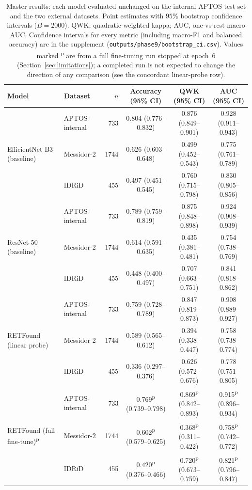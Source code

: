 \documentclass[journal]{IEEEtran}
\newcommand{\pv}[1]{#1\textsuperscript{p}}
\begin{document}
\begin{table}[!t]
\centering\footnotesize
\caption{Master results: each model evaluated unchanged on the internal APTOS test
set and the two external datasets. Point estimates with $95\%$ bootstrap
confidence intervals ($B=2000$). QWK, quadratic-weighted kappa; AUC, one-vs-rest
macro AUC. Confidence intervals for every metric (including macro-F1 and balanced
accuracy) are in the supplement (\texttt{outputs/phase9/bootstrap\_ci.csv}).
Values marked \textsuperscript{p} are from a full fine-tuning run stopped at
epoch~6 (Section~\ref{sec:limitations}); a completed run is not expected to change
the direction of any comparison (see the concordant linear-probe row).}
\label{tab:master}
\setlength{\tabcolsep}{5pt}
\begin{tabular}{llrccc}
\toprule
Model & Dataset & $n$ & Accuracy (95\% CI) & QWK (95\% CI) & AUC (95\% CI) \\
\midrule
\multirow{3}{*}{EfficientNet-B3 (baseline)}
 & APTOS-internal & 733  & 0.804 (0.776--0.832) & 0.876 (0.849--0.901) & 0.928 (0.911--0.943) \\
 & Messidor-2     & 1744 & 0.626 (0.603--0.648) & 0.499 (0.452--0.543) & 0.775 (0.761--0.789) \\
 & IDRiD          & 455  & 0.497 (0.451--0.545) & 0.760 (0.715--0.798) & 0.830 (0.805--0.856) \\
\midrule
\multirow{3}{*}{ResNet-50 (baseline)}
 & APTOS-internal & 733  & 0.789 (0.759--0.819) & 0.875 (0.848--0.898) & 0.924 (0.908--0.939) \\
 & Messidor-2     & 1744 & 0.614 (0.591--0.635) & 0.435 (0.381--0.481) & 0.754 (0.738--0.769) \\
 & IDRiD          & 455  & 0.448 (0.400--0.497) & 0.707 (0.663--0.751) & 0.841 (0.818--0.862) \\
\midrule
\multirow{3}{*}{RETFound (linear probe)}
 & APTOS-internal & 733  & 0.759 (0.728--0.789) & 0.847 (0.819--0.873) & 0.908 (0.889--0.927) \\
 & Messidor-2     & 1744 & 0.589 (0.565--0.612) & 0.394 (0.338--0.447) & 0.758 (0.738--0.774) \\
 & IDRiD          & 455  & 0.336 (0.297--0.376) & 0.626 (0.572--0.676) & 0.778 (0.751--0.805) \\
\midrule
\multirow{3}{*}{RETFound (full fine-tune)\textsuperscript{p}}
 & APTOS-internal & 733  & \pv{0.769} (0.739--0.798) & \pv{0.869} (0.842--0.893) & \pv{0.915} (0.896--0.934) \\
 & Messidor-2     & 1744 & \pv{0.602} (0.579--0.625) & \pv{0.368} (0.311--0.422) & \pv{0.758} (0.742--0.772) \\
 & IDRiD          & 455  & \pv{0.420} (0.376--0.466) & \pv{0.720} (0.673--0.759) & \pv{0.821} (0.796--0.847) \\
\bottomrule
\end{tabular}
\end{table}
\end{document}
